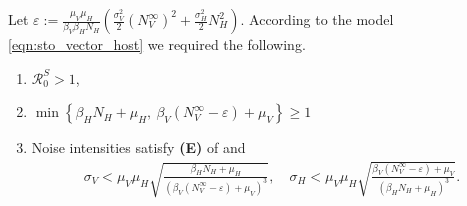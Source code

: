 \begin{assumption} \label{ass:persistence}
    Let
    $
        \displaystyle
        \varepsilon:=
            \frac{\mu_V \mu_H}{\beta_V \beta_H N_H}
                \left(
                    \frac{\sigma_V ^ 2}{2}
                    \left(
                        N_V ^ {\infty}
                    \right) ^ 2
                    +
                    \frac{\sigma_H ^ 2}{2}
                    N_H ^2
                \right)
    $.
    According to the model \eqref{eqn:sto_vector_host} we required the
    following.
    \begin{enumerate}[\bf{(P\textendash}1)]
        \item
            $ \mathcal{R}_0 ^ S > 1$,
             
        \item
        $
            \displaystyle
            \min
            \left\{
                 \beta_H N_H + \mu_H, \ 
                 \beta_V (N_V ^ {\infty} - \varepsilon) + \mu_V
            \right\}
            \geq 1
        $
        \item Noise intensities satisfy 
            \textbf{(E)} of 
            and
            \begin{align*}
                \sigma_V 
                    < \mu_V \mu_H
                    \sqrt{
                        \frac{\beta_H N_H + \mu_H}{
                            \left(
                                \beta_V
                                \left(
                                    N_V ^ {\infty} - \varepsilon
                                \right) 
                                + \mu_V
                            \right)  ^ 3
                        }
                    },
                \quad
                \sigma_H 
                    < \mu_V \mu_H
                    \sqrt{
                        \frac{\beta_V (N_V ^ {\infty} - \varepsilon) + \mu_V}{
                            \left(
                                \beta_H N_H + \mu_H
                            \right)  ^ 3
                        }
                    } .
            \end{align*}
    \end{enumerate}
\end{assumption}

